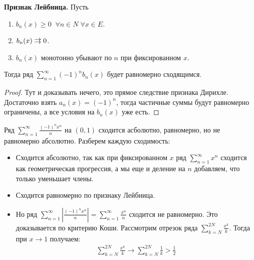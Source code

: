 \textbf{Признак Лейбница.} Пусть \begin{enumerate}
    \item $b_n(x) \geqslant 0 \;\; \forall n \in N \; \forall x \in E$.
    \item $b_n(x) \doublerightarrow 0$.
    \item $b_n(x)$ монотонно убывают по $n$ при фиксированном $x$.
\end{enumerate}
Тогда ряд $\sum\limits_{n = 1}^\infty (-1)^nb_n(x)$ будет равномерно сходящимся.

\begin{proof}
    Тут и доказывать нечего, это прямое следствие признака Дирихле.
    Достаточно взять $a_n(x) = (-1)^n$, тогда частичные суммы будут равномерно ограничены, а все условия на $b_n(x)$ уже есть.
\end{proof}

\begin{example}
    Ряд $\sum\limits_{n = 1}^\infty \frac{(-1)^nx^n}{n}$ на $(0, 1)$ сходится асболютно, равномерно, но не равномерно абсолютно.
    Разберем каждую сходимость: \begin{itemize}
        \item Сходится абсолютно, так как при фиксированном $x$ ряд $\sum\limits_{n=1}^\infty x^n$ сходится как геометрическая прогрессия, а мы еще и деление на $n$ добавляем, что только уменьшает члены.
        \item Сходится равномерно по признаку Лейбница.
        \item Но ряд $\sum\limits_{n = 1}^\infty \left|\frac{(-1)^nx^n}{n}\right| = \sum\limits_{n = 1}^\infty \frac{x^n}{n}$ сходится не равномерно.
        Это доказывается по критерию Коши. 
        Рассмотрим отрезок ряда $\sum\limits_{k = N}^{2N} \frac{x^k}{k}$.
        Тогда при $x \to 1$ получаем:
        \begin{gather*}
            \sum\limits_{k = N}^{2N} \frac{x^k}{k} \to \sum\limits_{k = N}^{2N} \frac{1}{k} > \frac{1}{2}
        \end{gather*}
    \end{itemize}
\end{example}

